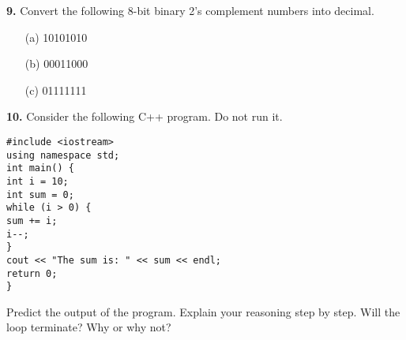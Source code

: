 \documentclass{article}
\begin{document}
\noindent\textbf{9.} Convert the following 8-bit binary 2’s complement numbers into decimal.
\begin{itemize}
    \item[(a)] 10101010
    \item[(b)] 00011000
    \item[(c)] 01111111
\end{itemize}

\noindent\textbf{10.} Consider the following C++ program. Do not run it.
\begin{verbatim}
#include <iostream>
using namespace std;
int main() {
int i = 10;
int sum = 0;
while (i > 0) {
sum += i;
i--;
}
cout << "The sum is: " << sum << endl;
return 0;
}
\end{verbatim}
Predict the output of the program. Explain your reasoning step by step.  Will the loop terminate? Why or why not?
\end{document}
